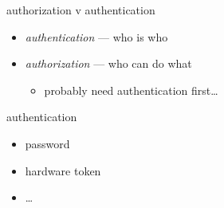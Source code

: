 \begin{frame}{authorization v authentication}
    \begin{itemize}
    \item \textit{authentication} --- who is who
    \vspace{.5cm}
    \item<2-> \textit{authorization} --- who can do what
        \begin{itemize}
        \item probably need authentication first\ldots
        \end{itemize}
    \end{itemize}
\end{frame}

\begin{frame}{authentication}
    \begin{itemize}
    \item password
    \item hardware token
    \item \ldots
    \end{itemize}
\end{frame}

